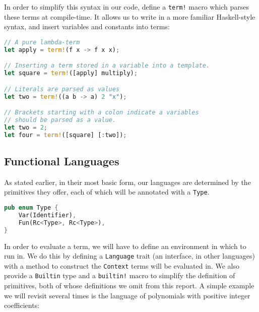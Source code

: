 \begin{center}
\end{center}

In order to simplify this syntax in our code, define a \texttt{term!} macro which parses these terms at compile-time. It allows us to write in a more familiar Haskell-style syntax, and insert variables and constants into terms:

\begin{lstlisting}[language=rust]
// A pure lambda-term
let apply = term!(f x -> f x x);

// Inserting a term stored in a variable into a template.
let square = term!([apply] multiply); 

// Literals are parsed as values  
let two = term!((a b -> a) 2 "x");

// Brackets starting with a colon indicate a variables
// should be parsed as a value.
let two = 2;
let four = term!([square] [:two]);
\end{lstlisting}

\subsection{Functional Languages}

As stated earlier, in their most basic form, our languages are determined by the primitives they offer, each of which will be annotated with a \texttt{Type}.

\begin{lstlisting}[language=rust]
pub enum Type {
    Var(Identifier),
    Fun(Rc<Type>, Rc<Type>),
}
\end{lstlisting}

In order to evaluate a term, we will have to define an environment in which to run in. We do this by defining a \texttt{Language} trait (an interface, in other languages) with a method to construct the \texttt{Context} terms will be evaluated in. We also provide a \texttt{Builtin} type and a \texttt{builtin!} macro to simplify the definition of primitives, both of whose definitions we omit from this report. A simple example we will revisit several times is the language of polynomials with positive integer coefficients:

